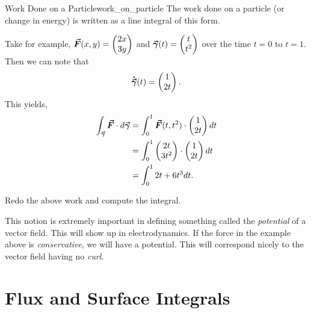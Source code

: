         \begin{ex}{Work Done on a Particle}{work_on_particle}
        The work done on a particle (or change in energy) is written as a line integral of this form.  
        
        Take for example, $\boldsymbol{\vec{F}}(x,y)=\begin{pmatrix} 2x \\ 3y \end{pmatrix}$ and $\boldsymbol{\vec{\gamma}}(t)=\begin{pmatrix} t \\ t^2 \end{pmatrix}$ over the time $t=0$ to $t=1$.  Then we can note that 
        \[
            \boldsymbol{\dot{\vec{\gamma}}}(t) = \begin{pmatrix} 1 \\ 2t \end{pmatrix}.
        \]
        This yields,
        \begin{align*}
        \int_{\boldsymbol{\vec{\gamma}}} \boldsymbol{\vec{F}} \cdot d\boldsymbol{\vec{\gamma}} &= \int_0^1 \boldsymbol{\vec{F}}(t,t^2)\cdot \begin{pmatrix} 1 \\ 2t \end{pmatrix} dt\\
        &= \int_0^1 \begin{pmatrix} 2t \\ 3t^2 \end{pmatrix} \cdot \begin{pmatrix} 1 \\ 2t \end{pmatrix}dt\\
        &=\int_0^1 2t+6t^3dt.
        \end{align*}
        \end{ex}
        
        \begin{exercise}
        	Redo the above work and compute the integral.
        \end{exercise}
        
        \begin{remark}
        This notion is extremely important in defining something called the \emph{potential} of a vector field.  This will show up in electrodynamics. If the force in the example above is \emph{conservative}, we will have a potential.  This will correspond nicely to the vector field having no \emph{curl}.
        \end{remark}

         \section{Flux and Surface Integrals}
         
